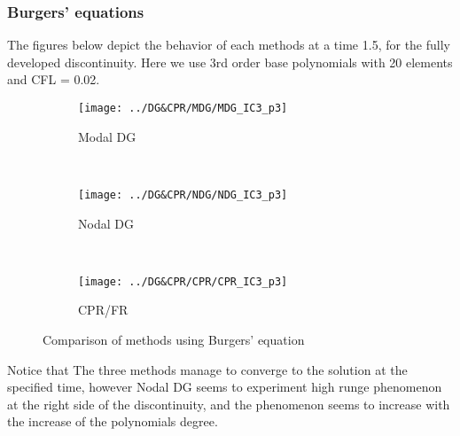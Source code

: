 \begin{frame} \frametitle{Burgers' equations}
The figures below depict the behavior of each methods at a time 1.5, for the fully developed discontinuity. Here we use 3rd order base polynomials with 20 elements and CFL = 0.02.
	\begin{figure}
        \centering
        \begin{subfigure}[b]{0.31\textwidth}
                \centering
                \texttt{[image: ../DG\&CPR/MDG/MDG\_IC3\_p3]}
                \caption{Modal DG}
                \label{fig:MDG_IC3_p3}
        \end{subfigure}%
				~
        \begin{subfigure}[b]{0.31\textwidth}
                \centering
                \texttt{[image: ../DG\&CPR/NDG/NDG\_IC3\_p3]}
                \caption{Nodal DG}
                \label{fig:NDG_IC3_p3}
        \end{subfigure}
				~
        \begin{subfigure}[b]{0.31\textwidth}
								\centering
                \texttt{[image: ../DG\&CPR/CPR/CPR\_IC3\_p3]}
                \caption{CPR/FR}
                \label{fig:CPR_IC3_p3}
        \end{subfigure}
				\caption{Comparison of methods using Burgers' equation}
				\label{fig:compareBurgers_p3}
	\end{figure}
	Notice that The three methods manage to converge to the solution at the specified time, however Nodal DG seems to experiment high runge phenomenon at the right side of the discontinuity, and the phenomenon seems to increase with the increase of the polynomials degree.
\end{frame}

